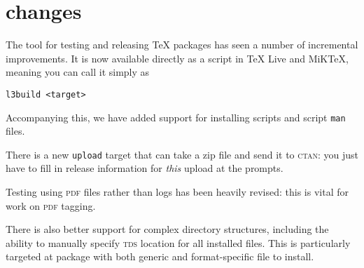 \documentclass{ltnews}
\begin{document}
\section{ changes}

The  tool for testing and releasing \TeX{} packages
has seen a number of incremental improvements. It is now available directly
as a script in \TeX{} Live and MiK\TeX{}, meaning you can call it simply
as
\begin{verbatim}
l3build <target>
\end{verbatim}
Accompanying this, we have added support for installing scripts and script
\texttt{man} files.

There is a new \texttt{upload} target that can take a zip file and send it to
\textsc{ctan}: you just have to fill in release information for \emph{this}
upload at the prompts.

Testing using \textsc{pdf} files rather than logs has been heavily revised:
this is vital for work on \textsc{pdf} tagging.

There is also better support for complex directory structures, including the
ability to manually specify \textsc{tds} location for all installed files. This
is particularly targeted at package with both generic and format-specific file
to install.
\end{document}
